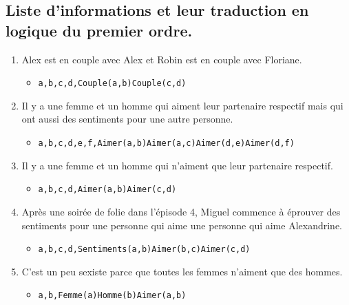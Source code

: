 \documentclass[Arial, 11pt]{article}
\begin{document}
\subsection*{Liste d'informations et leur traduction en logique du premier ordre.}
\begin{enumerate}
    \item Alex est en couple avec Alex et Robin est en couple avec Floriane.
    \begin{itemize}
        \item \begin{alltt}\exists a,b,c,d, Couple(a,b) \bigwedge Couple(c,d)\end{alltt}
    \end{itemize}
    \item Il y a une femme et un homme qui aiment leur partenaire respectif mais qui ont aussi des sentiments pour une autre personne.
    \begin{itemize}
        \item \begin{alltt}\exists a,b,c,d,e,f, Aimer(a,b) \bigwedge Aimer(a,c) \bigwedge Aimer(d,e) \bigwedge Aimer(d,f)\end{alltt}
    \end{itemize}
    \item Il y a une femme et un homme qui n’aiment que leur partenaire respectif.
    \begin{itemize}
        \item \begin{alltt}\exists a,b,c,d, Aimer(a,b) \bigwedge Aimer(c,d)\end{alltt}
    \end{itemize}
    \item Après une soirée de folie dans l’épisode 4, Miguel commence à éprouver des sentiments pour une personne qui aime une personne qui aime Alexandrine.
    \begin{itemize}
        \item \begin{alltt}\exists a,b,c,d, Sentiments(a,b) \bigwedge Aimer(b,c) \bigwedge Aimer(c,d)\end{alltt}
    \end{itemize}
    \item C’est un peu sexiste parce que toutes les femmes n’aiment que des hommes.
    \begin{itemize}
        \item \begin{alltt}\forall a,b, Femme(a) \bigwedge Homme(b) \to Aimer(a,b) \end{alltt}

\end{itemize}
\end{enumerate}
\end{document}
